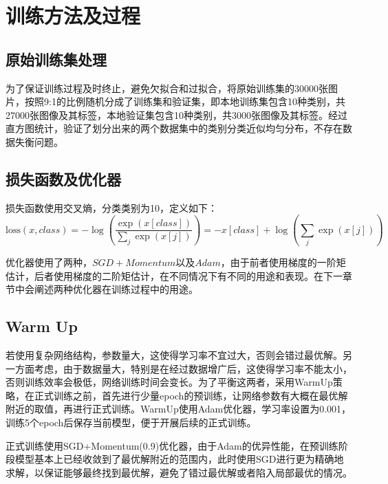 \documentclass[UTF8]{ctexart}
\begin{document}
\section{训练方法及过程}\label{chapter:2}
\subsection{原始训练集处理}
为了保证训练过程及时终止，避免欠拟合和过拟合，将原始训练集的30000张图片，按照9:1的比例随机分成了训练集和验证集，即本地训练集包含10种类别，共27000张图像及其标签，本地验证集包含10种类别，共3000张图像及其标签。经过直方图统计，验证了划分出来的两个数据集中的类别分类近似均匀分布，不存在数据失衡问题。

\subsection{损失函数及优化器}
损失函数使用交叉熵，分类类别为10，定义如下：
\begin{equation}
    \text{loss}(x, class) = -\log\left(\frac{\exp(x[class])}{\sum_j \exp(x[j])}\right)
    = -x[class] + \log\left(\sum_j \exp(x[j])\right)
\end{equation}

优化器使用了两种，$SGD+Momentum$以及$Adam$，由于前者使用梯度的一阶矩估计，后者使用梯度的二阶矩估计，在不同情况下有不同的用途和表现。在下一章节中会阐述两种优化器在训练过程中的用途。

\subsection{Warm Up}
若使用复杂网络结构，参数量大，这使得学习率不宜过大，否则会错过最优解。另一方面考虑，由于数据量大，特别是在经过数据增广后，这使得学习率不能太小，否则训练效率会极低，网络训练时间会变长。为了平衡这两者，采用WarmUp策略，在正式训练之前，首先进行少量epoch的预训练，让网络参数有大概在最优解附近的取值，再进行正式训练。WarmUp使用Adam优化器，学习率设置为0.001，训练5个epoch后保存当前模型，便于开展后续的正式训练。

正式训练使用SGD+Momentum(0.9)优化器，由于Adam的优异性能，在预训练阶段模型基本上已经收敛到了最优解附近的范围内，此时使用SGD进行更为精确地求解，以保证能够最终找到最优解，避免了错过最优解或者陷入局部最优的情况。
\end{document}
